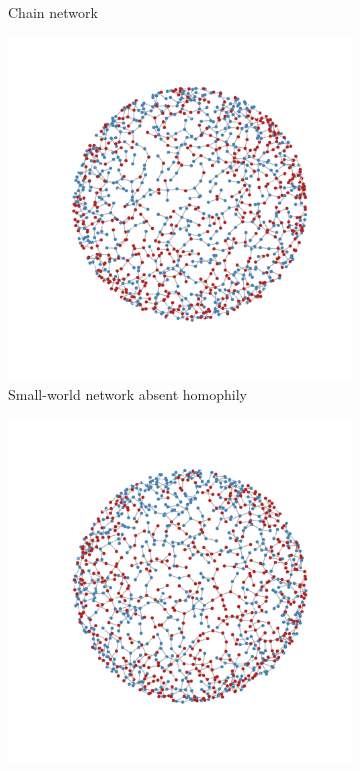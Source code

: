 \documentclass[man, 12pt, a4paper, noextraspace]{apa6}
\begin{document}
\begin{figure}
\begin{subfigure}[t]{0.45\textwidth}
        \caption{Chain network} \label{fig1:tree}
    \end{subfigure}

    \vspace{1cm}
    \begin{subfigure}[t]{0.45\textwidth}
        \centering
        \includegraphics[trim={2cm 2cm 2cm 2cm}, clip, width=\linewidth]{draft/network_plots3.pdf} 
        \caption{Small-world network absent homophily} \label{fig1:nohomophily}
    \end{subfigure}
    \hfill
    \begin{subfigure}[t]{0.45\textwidth}
        \centering
        \includegraphics[trim={2cm 2cm 2cm 2cm}, clip, width=\linewidth]{draft/network_plots4.pdf} 

\end{subfigure}
\end{figure}
\end{document}
